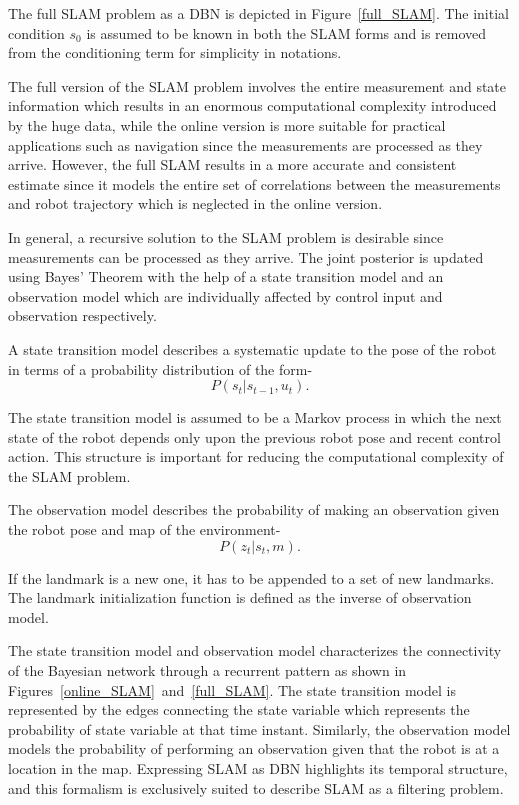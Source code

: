 The full SLAM problem as a DBN is depicted in Figure~\ref{full_SLAM}. The initial condition $s_0$ is assumed to be known in both the SLAM forms and is removed from the conditioning term for simplicity in notations.

The full version of the SLAM problem involves the entire measurement and state information which results in an enormous computational complexity introduced by the huge data, while the online version is more suitable for practical applications such as navigation since the measurements are processed as they arrive. However, the full SLAM results in a more accurate and consistent estimate since it models the entire set of correlations between the measurements and robot trajectory which is neglected in the online version.

In general, a recursive solution to the SLAM problem is desirable since measurements can be processed as they arrive. The joint posterior is updated using Bayes' Theorem with the help of a state transition model and an observation model which are individually affected by control input and observation respectively. 

A state transition model describes a systematic update to the pose of the robot in terms of a probability distribution of the form-
\begin{equation}
P(s_t|s_{t-1},u_t).
\end{equation} 

The state transition model is assumed to be a Markov process in which the next state of the robot depends only upon the previous robot pose and recent control action. This structure is important for reducing the computational complexity of the SLAM problem.  

The observation model describes the probability of making an observation given the robot pose and map of the environment- 
\begin{equation}
P(z_t|s_t,m).
\end{equation}

If the landmark is a new one, it has to be appended to a set of new landmarks. The landmark initialization function is defined as the inverse of observation model. 

The state transition model and observation model characterizes the connectivity of the Bayesian network through a recurrent pattern as shown in Figures~\ref{online_SLAM}~and~\ref{full_SLAM}. The state transition model is represented by the edges connecting the state variable which represents the probability of state variable at that time instant. Similarly, the observation model models the probability of performing an observation given that the robot is at a location in the map. Expressing SLAM as DBN highlights its temporal structure, and this formalism is exclusively suited to describe SLAM as a filtering problem. 

